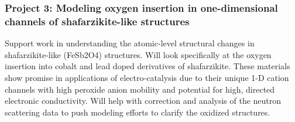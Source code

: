 \subsubsection*{Project 3: Modeling oxygen insertion in one-dimensional channels of shafarzikite-like structures}\label{deLaune}
Support work in understanding the atomic-level structural changes in shafarzikite-like (FeSb2O4) structures. Will look specifically at the oxygen insertion into cobalt and lead doped derivatives of shafarzikite. These materials show promise in applications of electro-catalysis due to their unique 1-D cation channels with high peroxide anion mobility and potential for high, directed electronic conductivity. Will help with correction and analysis of the neutron scattering data to push modeling efforts to clarify the oxidized structures.